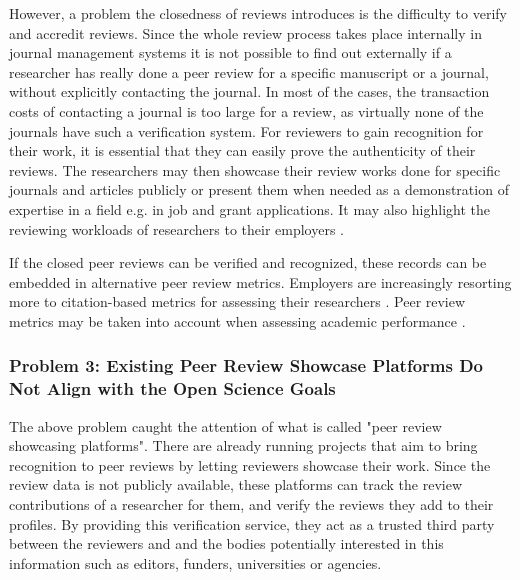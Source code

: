However, a problem the closedness of reviews introduces is the difficulty to verify and accredit reviews. Since the whole review process takes place internally in journal management systems it is not possible to find out externally if a researcher has really done a peer review for a specific manuscript or a journal, without explicitly contacting the journal. In most of the cases, the transaction costs of contacting a journal is too large for a review, as virtually none of the journals have such a verification system. For reviewers to gain recognition for their work, it is essential that they can easily prove the authenticity of their reviews. The researchers may then showcase their review works done for specific journals and articles publicly or present them when needed as a demonstration of expertise in a field e.g. in job and grant applications. It may also highlight the reviewing workloads of researchers to their employers \parencite[2]{Raoult.2020}. 

If the closed peer reviews can be verified and recognized, these records can be embedded in alternative peer review metrics. Employers are increasingly resorting more to citation-based metrics for assessing their researchers \parencite{Bianchi.2019, Cantor.2015, Kachewar.2013, Verissimo.2013}. Peer review metrics may be taken into account when assessing academic performance \parencite[11]{Ferreira.2016}.

\subsubsection{Problem 3: Existing Peer Review Showcase Platforms Do Not Align with the Open Science Goals}

The above problem caught the attention of what is called "peer review showcasing platforms". There are already running projects that aim to bring recognition to peer reviews by letting reviewers showcase their work. Since the review data is not publicly available, these platforms can track the review contributions of a researcher for them, and verify the reviews they add to their profiles. By providing this verification service, they act as a trusted third party between the reviewers and  and the bodies potentially interested in this information such as editors, funders, universities or agencies.


